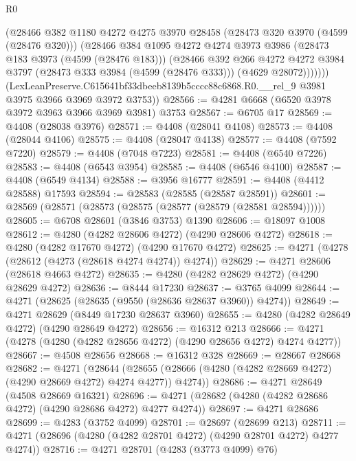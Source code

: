 \begin{lexlean}{R0}
\begin{coremodule}
            (@28466
              @382
              @1180
              @4272
              @4275
              @3970
              @28458
              (@28473 @320 @3970 (@4599 (@28476 @320)))
              (@28466
                @384
                @1095
                @4272
                @4274
                @3973
                @3986
                (@28473 @183 @3973 (@4599 (@28476 @183)))
                (@28466
                  @392
                  @266
                  @4272
                  @4272
                  @3984
                  @3797
                  (@28473 @333 @3984 (@4599 (@28476 @333)))
                  (@4629 @28072)))))))
      (LexLeanPreserve.C615641bf33dbeeb8139b5cccc88c6868.R0.__rel_9
        @3981
        @3975
        @3966
        @3969
        @3972
        @3753))
@28566 := @4281 @6668 (@6520 @3978 @3972 @3963 @3966 @3969 @3981) @3753
@28567 := @6705 @17
@28569 := @4408 (@28038 @3976)
@28571 := @4408 (@28041 @4108)
@28573 := @4408 (@28044 @4106)
@28575 := @4408 (@28047 @4138)
@28577 := @4408 (@7592 @7220)
@28579 := @4408 (@7048 @7223)
@28581 := @4408 (@6540 @7226)
@28583 := @4408 (@6543 @3954)
@28585 := @4408 (@6546 @4100)
@28587 := @4408 (@6549 @4134)
@28588 := @3956 @16777
@28591 := @4408 (@4412 @28588) @17593
@28594 := @28583 (@28585 (@28587 @28591))
@28601 := @28569 (@28571 (@28573 (@28575 (@28577 (@28579 (@28581 @28594))))))
@28605 := @6708 @28601 (@3846 @3753) @1390
@28606 := @18097 @1008
@28612 := @4280 (@4282 @28606 @4272) (@4290 @28606 @4272)
@28618 := @4280 (@4282 @17670 @4272) (@4290 @17670 @4272)
@28625 := @4271 (@4278 (@28612 (@4273 (@28618 @4274 @4274)) @4274))
@28629 := @4271 @28606 (@28618 @4663 @4272)
@28635 := @4280 (@4282 @28629 @4272) (@4290 @28629 @4272)
@28636 := @8444 @17230
@28637 := @3765 @4099
@28644 := @4271 (@28625 (@28635 (@9550 (@28636 @28637 @3960)) @4274))
@28649 := @4271 @28629 (@8449 @17230 @28637 @3960)
@28655 := @4280 (@4282 @28649 @4272) (@4290 @28649 @4272)
@28656 := @16312 @213
@28666 := @4271 (@4278 (@4280 (@4282 @28656 @4272) (@4290 @28656 @4272) @4274 @4277))
@28667 := @4508 @28656
@28668 := @16312 @328
@28669 := @28667 @28668
@28682 := @4271
    (@28644 (@28655 (@28666 (@4280 (@4282 @28669 @4272) (@4290 @28669 @4272) @4274 @4277)) @4274))
@28686 := @4271 @28649 (@4508 @28669 @16321)
@28696 := @4271 (@28682 (@4280 (@4282 @28686 @4272) (@4290 @28686 @4272) @4277 @4274))
@28697 := @4271 @28686
@28699 := @4283 (@3752 @4099)
@28701 := @28697 (@28699 @213)
@28711 := @4271 (@28696 (@4280 (@4282 @28701 @4272) (@4290 @28701 @4272) @4277 @4274))
@28716 := @4271 @28701 (@4283 (@3773 @4099) @76)

\end{coremodule}
\end{lexlean}
